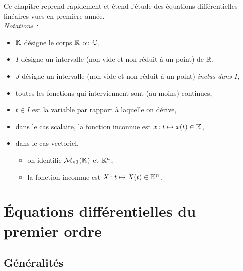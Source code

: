 \documentclass{book}
\begin{document}
Ce chapitre reprend rapidement et étend l'étude des équations différentielles linéaires vues en première année.\\
\textit{Notations :}
\begin{itemize}
\item $\mathbb{K}$ désigne le corps $\mathbb{R}$ ou $\mathbb{C}$,
\item $I$ désigne un intervalle (non vide et non réduit à un point) de $\mathbb{R}    $,
\item $J$ désigne un intervalle (non vide et non réduit à un point) \emph{inclus dans $I$},
\item toutes les fonctions qui interviennent sont (au moins) continues,
\item $t\in I$ est la variable par rapport à laquelle on dérive,
\item dans le cas scalaire, la fonction inconnue est $x \colon t \mapsto x(t)\in \mathbb{K}     $,
\item dans le cas vectoriel,
  \begin{itemize}
  \item on identifie $\mathcal{M}_{n1}(\mathbb{K})$ et $\mathbb{K}^n$,
  \item la fonction inconnue est $X \colon t \mapsto X(t)\in \mathbb{K}^n$.
  \end{itemize}
\end{itemize}

\section{Équations différentielles du premier ordre}
\subsection{Généralités}
\end{document}
